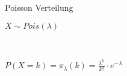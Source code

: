 \documentclass[10pt,a4paper,landscape]{article}
\begin{document}
\begin{multicols*}{4}
Poisson Verteilung\\
\parbox{\columnwidth}{\centering $X \sim Pois(\lambda)$}\\
\parbox{\columnwidth}{\centering $P(X = k) = \pi_\lambda(k) = \frac{\lambda^k}{k!} \cdot e^{-\lambda}$}\\


\end{multicols*}
\end{document}
